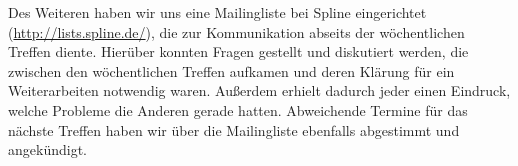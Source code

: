 Des Weiteren haben wir uns eine Mailingliste bei Spline eingerichtet (\url{http://lists.spline.de/}), die zur Kommunikation abseits der wöchentlichen Treffen diente. Hierüber konnten Fragen gestellt und diskutiert werden, die zwischen den wöchentlichen Treffen aufkamen und deren Klärung für ein Weiterarbeiten notwendig waren. Außerdem erhielt dadurch jeder einen Eindruck, welche Probleme die Anderen gerade hatten. Abweichende Termine für das nächste Treffen haben wir über die Mailingliste ebenfalls abgestimmt und angekündigt.
